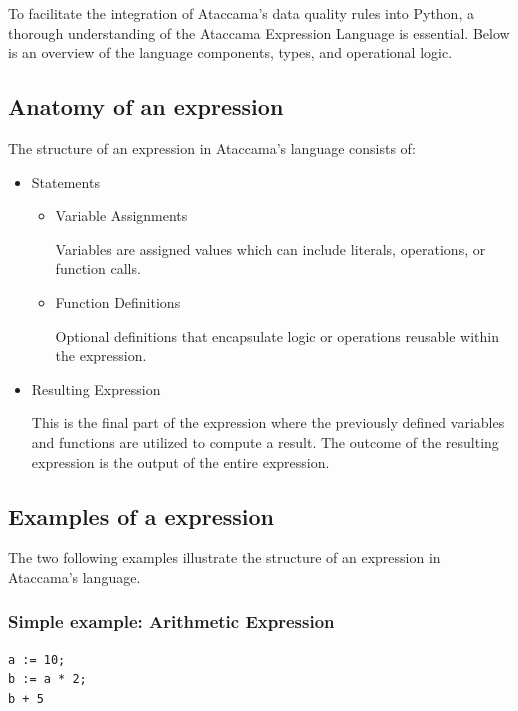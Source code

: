 To facilitate the integration of Ataccama's data quality rules into Python, a thorough understanding of the Ataccama Expression Language is essential. Below is an overview of the language components, types, and operational logic.

\subsection{Anatomy of an expression}

The structure of an expression in Ataccama's language consists of:

\begin{itemize}

    \item Statements
    
        \begin{itemize}
            \item Variable Assignments
            
            Variables are assigned values which can include literals, operations, or function calls.
            \item Function Definitions
            
            Optional definitions that encapsulate logic or operations reusable within the expression.
        \end{itemize}
    \item Resulting Expression
    
    This is the final part of the expression where the previously defined variables and functions are utilized to compute a result. The outcome of the resulting expression is the output of the entire expression.
\end{itemize}


\subsection{Examples of a expression}

The two following examples illustrate the structure of an expression in Ataccama's language.

\subsubsection{Simple example: Arithmetic Expression}


\begin{verbatim}
a := 10;  
b := a * 2; 
b + 5
\end{verbatim}

